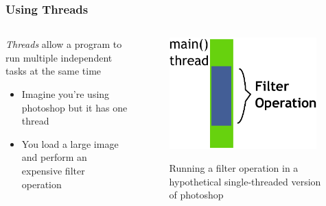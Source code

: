 \documentclass{beamer}
\newcommand{\linespace}{\vskip 0.25cm}
\begin{document}
\begin{frame}
\frametitle{Using Threads}

\begin{columns}
	\begin{column}{0.5\textwidth}
		\emph{Threads} allow a program to run multiple independent tasks at the same time

		\linespace
		\begin{itemize}
		\item Imagine you're using photoshop but it has one thread
		\item You load a large image and perform an expensive filter operation
		\end{itemize}
		\end{column}
	\begin{column}{0.5\textwidth}
		\begin{figure}
		\includegraphics[width=0.95\textwidth]{Illustrations/ThreadExample_GUI_Part1}
		\label{fig:domains}
		\caption{Running a filter operation in a hypothetical single-threaded version of photoshop}
		\end{figure}
	\end{column}
\end{columns}

\end{frame}
\end{document}
